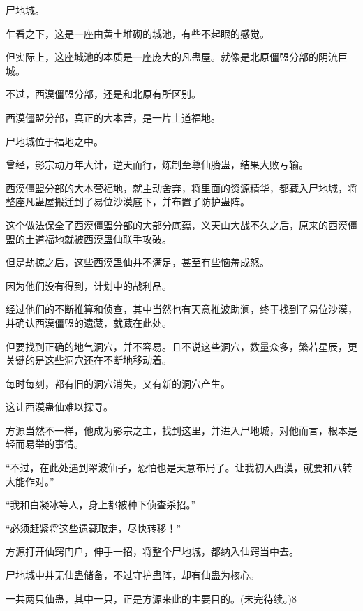 \begin{this_body}
尸地城。

乍看之下，这是一座由黄土堆砌的城池，有些不起眼的感觉。

但实际上，这座城池的本质是一座庞大的凡蛊屋。就像是北原僵盟分部的阴流巨城。

不过，西漠僵盟分部，还是和北原有所区别。

西漠僵盟分部，真正的大本营，是一片土道福地。

尸地城位于福地之中。

曾经，影宗动万年大计，逆天而行，炼制至尊仙胎蛊，结果大败亏输。

西漠僵盟分部的大本营福地，就主动舍弃，将里面的资源精华，都藏入尸地城，将整座凡蛊屋搬迁到了易位沙漠底下，并布置了防护蛊阵。

这个做法保全了西漠僵盟分部的大部分底蕴，义天山大战不久之后，原来的西漠僵盟的土道福地就被西漠蛊仙联手攻破。

但是劫掠之后，这些西漠蛊仙并不满足，甚至有些恼羞成怒。

因为他们没有得到，计划中的战利品。

经过他们的不断推算和侦查，其中当然也有天意推波助澜，终于找到了易位沙漠，并确认西漠僵盟的遗藏，就藏在此处。

但要找到正确的地气洞穴，并不容易。且不说这些洞穴，数量众多，繁若星辰，更关键的是这些洞穴还在不断地移动着。

每时每刻，都有旧的洞穴消失，又有新的洞穴产生。

这让西漠蛊仙难以探寻。

方源当然不一样，他成为影宗之主，找到这里，并进入尸地城，对他而言，根本是轻而易举的事情。

“不过，在此处遇到翠波仙子，恐怕也是天意布局了。让我初入西漠，就要和八转大能作对。”

“我和白凝冰等人，身上都被种下侦查杀招。”

“必须赶紧将这些遗藏取走，尽快转移！”

方源打开仙窍门户，伸手一招，将整个尸地城，都纳入仙窍当中去。

尸地城中并无仙蛊储备，不过守护蛊阵，却有仙蛊为核心。

一共两只仙蛊，其中一只，正是方源来此的主要目的。(未完待续。)8

\end{this_body}

